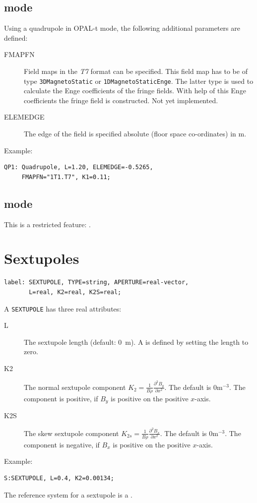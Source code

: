 \subsection{\opalt mode}
\label{sec:quadrupole-t}
Using a quadrupole in OPAL-t mode, the following additional parameters are defined:
\begin{description}
\item[FMAPFN]
  Field maps in the {\em T7} format can be specified. This field map has to be of type \texttt{3DMagnetoStatic}
  or \texttt{1DMagnetoStaticEnge}. The latter type is used to calculate the Enge coefficients of the fringe fields.
  With help of this Enge coefficients the fringe field is constructed. Not yet implemented.
\item[ELEMEDGE]
  The edge of the field is specified absolute (floor space co-ordinates) in m.
  \end{description}
\noindent Example:
\begin{verbatim}
QP1: Quadrupole, L=1.20, ELEMEDGE=-0.5265, 
     FMAPFN="1T1.T7", K1=0.11;
\end{verbatim}

\subsection{\opalcycl mode}

This is a restricted feature:  \noopalcycl .

\section{Sextupoles}
\label{sec:sextupole}
\begin{verbatim}
label: SEXTUPOLE, TYPE=string, APERTURE=real-vector,
       L=real, K2=real, K2S=real;
\end{verbatim}
A \texttt{SEXTUPOLE} has three real attributes:
\begin{description}
\item[L]
  The sextupole length (default: 0~m).
  A  is defined by setting the length to zero.
\item[K2]
  The normal sextupole component
  $K_2=\frac{1}{B \rho}\frac{\partial^2 B_y}{\partial x^2}$.
  The default is $0 \mathrm{m}^{-3}$.
  The component is positive, if $B_y$ is positive on the positive $x$-axis.
\item[K2S]
  The skew sextupole component
  $K_{2s}=\frac{1}{B \rho}\frac{\partial^2 B_x}{\partial x^2}$.
  The default is $0 \mathrm{m}^{-3}$.
  The component is negative, if $B_x$ is positive on the positive $x$-axis.
\end{description}
\noindent Example:
\begin{verbatim}
S:SEXTUPOLE, L=0.4, K2=0.00134;
\end{verbatim}
The reference system for a sextupole is a 
.
